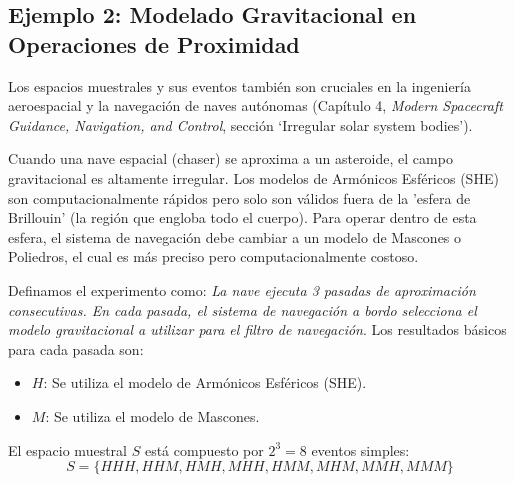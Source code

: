 \subsection{Ejemplo 2: Modelado Gravitacional en Operaciones de Proximidad}

Los espacios muestrales y sus eventos también son cruciales en la ingeniería aeroespacial y la navegación de naves autónomas (Capítulo 4, \textit{Modern Spacecraft Guidance, Navigation, and Control}, sección `Irregular solar system bodies'). 

Cuando una nave espacial (chaser) se aproxima a un asteroide, el campo gravitacional es altamente irregular. Los modelos de Armónicos Esféricos (SHE) son computacionalmente rápidos pero solo son válidos fuera de la 'esfera de Brillouin' (la región que engloba todo el cuerpo). Para operar dentro de esta esfera, el sistema de navegación debe cambiar a un modelo de Mascones o Poliedros, el cual es más preciso pero computacionalmente costoso.

Definamos el experimento como: \textit{La nave ejecuta 3 pasadas de aproximación consecutivas. En cada pasada, el sistema de navegación a bordo selecciona el modelo gravitacional a utilizar para el filtro de navegación}. 
Los resultados básicos para cada pasada son:
\begin{itemize}
    \item $H$: Se utiliza el modelo de Armónicos Esféricos (SHE).
    \item $M$: Se utiliza el modelo de Mascones.
\end{itemize}

El espacio muestral $S$ está compuesto por $2^3 = 8$ eventos simples:
$$ S = \{HHH, HHM, HMH, MHH, HMM, MHM, MMH, MMM\} $$

